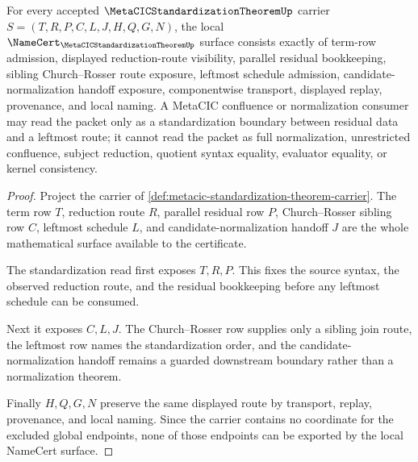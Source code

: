 \begin{theorem}
\label{thm:metacic-standardization-theorem-namecert-obligations}
For every accepted $\MetaCICStandardizationTheoremUp$ carrier $S=(T,R,P,C,L,J,H,Q,G,N)$, the local $\NameCert_{\MetaCICStandardizationTheoremUp}$ surface consists exactly of term-row admission, displayed reduction-route visibility, parallel residual bookkeeping, sibling Church--Rosser route exposure, leftmost schedule admission, candidate-normalization handoff exposure, componentwise transport, displayed replay, provenance, and local naming. A MetaCIC confluence or normalization consumer may read the packet only as a standardization boundary between residual data and a leftmost route; it cannot read the packet as full normalization, unrestricted confluence, subject reduction, quotient syntax equality, evaluator equality, or kernel consistency.
\end{theorem}
\begin{proof}
Project the carrier of \autoref{def:metacic-standardization-theorem-carrier}. The term row $T$, reduction route $R$, parallel residual row $P$, Church--Rosser sibling row $C$, leftmost schedule $L$, and candidate-normalization handoff $J$ are the whole mathematical surface available to the certificate.

The standardization read first exposes $T,R,P$. This fixes the source syntax, the observed reduction route, and the residual bookkeeping before any leftmost schedule can be consumed.

Next it exposes $C,L,J$. The Church--Rosser row supplies only a sibling join route, the leftmost row names the standardization order, and the candidate-normalization handoff remains a guarded downstream boundary rather than a normalization theorem.

Finally $H,Q,G,N$ preserve the same displayed route by transport, replay, provenance, and local naming. Since the carrier contains no coordinate for the excluded global endpoints, none of those endpoints can be exported by the local NameCert surface.
\end{proof}

